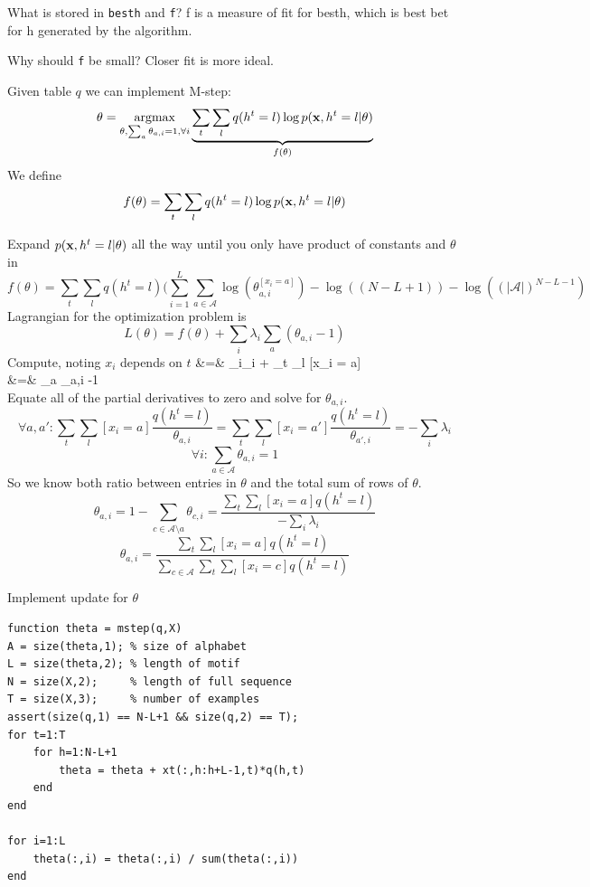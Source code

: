 \documentclass{article}
\begin{document}
{What is stored in \verb|besth| and \verb|f|? f is a measure of fit for besth, which is best bet for h generated by the algorithm.

Why should \verb|f| be small? Closer fit is more ideal.

\newproblem{2pt} Given table $q$ we can implement M-step:
\[
\theta = \mathop{\rm argmax}_{\theta,\sum_a \theta_{a,i} = 1,\forall i} \underbrace{\sum_t \sum_l q(h^t = l) \log p(\mathbf{x},h^t = l|\theta)}_{f(\theta)}
\]
We define 
\[
f(\theta) = \sum_t \sum_l q(h^t = l) \log p(\mathbf{x},h^t = l|\theta)
\]

Expand $p(\mathbf{x},h^t=l | \theta)$ all the way until you only have
product of constants and $\theta$ in
\[
f(\theta) = \sum_t \sum_l q(h^t = l) (\sum_{i=1}^L\sum_{a \in \mathcal{A}} \log(\theta_{a,i}^{[x_i = a]})-\log((N-L+1)) -\log((|\mathcal{A}|)^{N-L-1})
\]
Lagrangian for the optimization problem is
\[
L(\theta) = f(\theta) + \sum_i \lambda_i \sum_a (\theta_{a,i} - 1)
\]
Compute, noting $x_i$ depends on $t$
\BEAS
{} &=& \sum_i\lambda_i + \sum_t \sum_l [x_i = a] \\
 &=& \sum_a \theta_{a,i} -1 \\
\EEAS
Equate all of the partial derivatives to zero and solve for $\theta_{a,i}$.
\[
\forall a,a': \sum_t \sum_l [x_i = a] \frac{q(h^t = l)}{\theta_{a,i}} = \sum_t \sum_l [x_i = a'] \frac{q(h^t = l)}{\theta_{a',i}} = -\sum_i\lambda_i
\]
\[
\forall i :  \sum_{a \in \mathcal{A}} \theta_{a,i} = 1
\]
So we know both ratio between entries in $\theta$ and the total sum of rows of $\theta$.
\[
\theta_{a,i} = 1 -\sum_{c \in {\mathcal{A} \setminus {a}}} \theta_{c,i} = \frac{\sum_t \sum_l [x_i = a] q(h^t = l)}{-\sum_i\lambda_i}
\]
\[
\theta_{a,i} = \frac{\sum_t \sum_l [x_i = a] q(h^t = l)}{\sum_{c \in {\mathcal{A}}}\sum_t \sum_l [x_i = c] q(h^t = l)}
\]




Implement update for $\theta$
\begin{verbatim}
function theta = mstep(q,X)
A = size(theta,1); % size of alphabet
L = size(theta,2); % length of motif
N = size(X,2);     % length of full sequence
T = size(X,3);     % number of examples
assert(size(q,1) == N-L+1 && size(q,2) == T);
for t=1:T
    for h=1:N-L+1
        theta = theta + xt(:,h:h+L-1,t)*q(h,t)
    end
end

for i=1:L
    theta(:,i) = theta(:,i) / sum(theta(:,i))
end
\end{verbatim}

}
\end{document}
